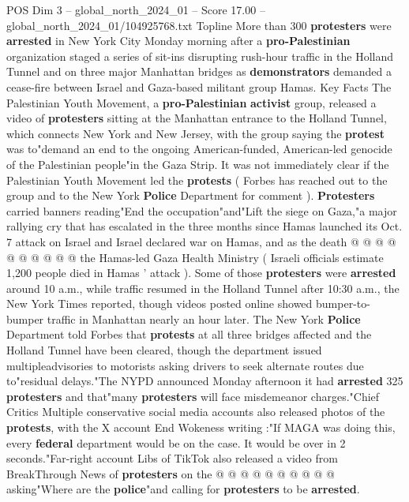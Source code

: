 \begin{textsample}{POS Dim 3 – global\_north\_2024\_01 – Score 17.00 – global\_north\_2024\_01/104925768.txt}  \label{ex:f3_pos_241}
Topline More than 300 \textbf{protesters} were \textbf{arrested} in New York City Monday morning after a \textbf{pro-Palestinian} organization staged a series of sit-ins disrupting rush-hour traffic in the Holland Tunnel and on three major Manhattan bridges as \textbf{demonstrators} demanded a cease-fire between Israel and Gaza-based militant group Hamas.
Key Facts The Palestinian Youth Movement, a \textbf{pro-Palestinian} \textbf{activist} group, released a video of \textbf{protesters} sitting at the Manhattan entrance to the Holland Tunnel, which connects New York and New Jersey, with the group saying the \textbf{protest} was to"demand an end to the ongoing American-funded, American-led genocide of the Palestinian people"in the Gaza Strip.
It was not immediately clear if the Palestinian Youth Movement led the \textbf{protests} ( Forbes has reached out to the group and to the New York \textbf{Police} Department for comment ). \textbf{Protesters} carried banners reading"End the occupation"and"Lift the siege on Gaza,"a major rallying cry that has escalated in the three months since Hamas launched its Oct. 7 attack on Israel and Israel declared war on Hamas, and as the death @ @ @ @ @ @ @ @ @ @ the Hamas-led Gaza Health Ministry ( Israeli officials estimate 1,200 people died in Hamas ' attack ).
Some of those \textbf{protesters} were \textbf{arrested} around 10 a.m., while traffic resumed in the Holland Tunnel after 10:30 a.m., the New York Times reported, though videos posted online showed bumper-to-bumper traffic in Manhattan nearly an hour later.
The New York \textbf{Police} Department told Forbes that \textbf{protests} at all three bridges affected and the Holland Tunnel have been cleared, though the department issued multipleadvisories to motorists asking drivers to seek alternate routes due to"residual delays."The NYPD announced Monday afternoon it had \textbf{arrested} 325 \textbf{protesters} and that"many \textbf{protesters} will face misdemeanor charges."Chief Critics Multiple conservative social media accounts also released photos of the \textbf{protests}, with the X account End Wokeness writing :"If MAGA was doing this, every \textbf{federal} department would be on the case.
It would be over in 2 seconds."Far-right account Libs of TikTok also released a video from BreakThrough News of \textbf{protesters} on the @ @ @ @ @ @ @ @ @ @ asking"Where are the \textbf{police}"and calling for \textbf{protesters} to be \textbf{arrested}.

\end{textsample}
